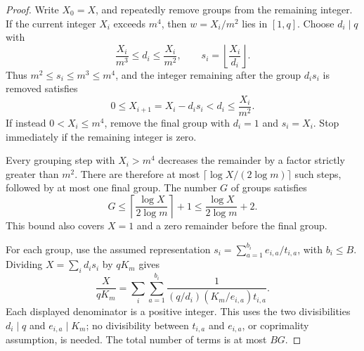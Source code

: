 \begin{proof}
Write $X_0=X$, and repeatedly remove groups from the remaining integer.
If the current integer $X_i$ exceeds $m^4$, then
$w=X_i/m^2$ lies in $[1,q]$.  Choose $d_i\mid q$ with
\[
  \frac{X_i}{m^3}\le d_i\le\frac{X_i}{m^2},
  \qquad s_i=\left\lfloor\frac{X_i}{d_i}\right\rfloor.
\]
Thus $m^2\le s_i\le m^3\le m^4$, and the integer remaining after the
group $d_i s_i$ is removed satisfies
\[
  0\le X_{i+1}=X_i-d_i s_i<d_i\le\frac{X_i}{m^2}.
\]
If instead $0<X_i\le m^4$, remove the final group with $d_i=1$ and
$s_i=X_i$.  Stop immediately if the remaining integer is zero.

Every grouping step with $X_i>m^4$ decreases the remainder by a factor
strictly greater than $m^2$.  There are therefore at most
$\lceil\log X/(2\log m)\rceil$ such steps, followed by at most one
final group.  The number $G$ of groups satisfies
\[
  G\le\left\lceil\frac{\log X}{2\log m}\right\rceil+1
    \le\frac{\log X}{2\log m}+2.
\]
This bound also covers $X=1$ and a zero remainder before the final group.

For each group, use the assumed representation
$s_i=\sum_{a=1}^{b_i}e_{i,a}/t_{i,a}$, with $b_i\le B$.
Dividing $X=\sum_i d_i s_i$ by $qK_m$ gives
\[
  \frac{X}{qK_m}
    =\sum_i\sum_{a=1}^{b_i}
       \frac{1}{(q/d_i)(K_m/e_{i,a})t_{i,a}}.
\]
Each displayed denominator is a positive integer.  This uses the two
divisibilities $d_i\mid q$ and $e_{i,a}\mid K_m$; no divisibility between
$t_{i,a}$ and $e_{i,a}$, or coprimality assumption, is needed.  The total
number of terms is at most $BG$.
\end{proof}

